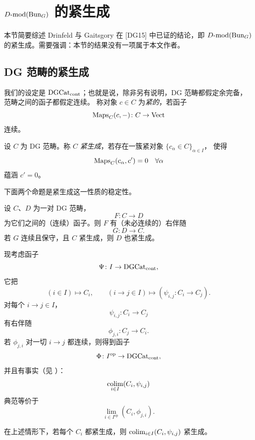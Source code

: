 
\section{\texorpdfstring{$D\text{-}\mathrm{mod}(\mathrm{Bun}_G)$ 的紧生成}{D-mod(G) 的紧生成}}
\label{sec:cg-bung}

本节简要综述 Drinfeld 与 Gaitsgory 在 [DG15] 中已证的结论，即
$D\text{-}\mathrm{mod}(\mathrm{Bun}_G)$ 的紧生成。需要强调：本节的结果没有一项属于本文作者。


\subsection{DG 范畴的紧生成}
\label{sec:cg-dg}

我们的设定是 $\mathrm{DGCat}_{\mathrm{cont}}$；也就是说，除非另有说明，DG 范畴都假定余完备，
范畴之间的函子都假定连续。
称对象 $c\in C$ 为\emph{紧的}，若函子
\[
\operatorname{Maps}_C(c,-)\colon C\to \mathrm{Vect}
\]
连续。

\begin{definition}[{[DG15, 1.2.2]}]
\label{def:comp-gen}
设 $C$ 为 DG 范畴。称 $C$ \emph{紧生成}，若存在一簇紧对象 $\{c_\alpha\in C\}_{\alpha\in I}$，
使得
\[
\operatorname{Maps}_C(c_\alpha,c')=0\quad\forall\alpha
\]
蕴涵 $c'=0$。
\end{definition}


下面两个命题是紧生成这一性质的稳定性。

\begin{proposition}
\label{prop:comp-gen-adjoint}
设 $C$、$D$ 为一对 DG 范畴，
\[
F\colon C\to D
\]
为它们之间的（连续）函子。则 $F$ 有（未必连续的）右伴随
\[
G\colon D\to C.
\]
若 $G$ 连续且保守，且 $C$ 紧生成，则 $D$ 也紧生成。
\end{proposition}

现考虑函子
\[
\Psi\colon I\to \mathrm{DGCat}_{\mathrm{cont}},
\]
它把
\[
(i\in I)\mapsto C_i,\qquad (i\to j\in I)\mapsto (\psi_{i,j}\colon C_i\to C_j).
\]
对每个 $i\to j\in I$，
\[
\psi_{i,j}\colon C_i\to C_j
\]
有右伴随
\[
\phi_{j,i}\colon C_j\to C_i.
\]
若 $\phi_{j,i}$ 对一切 $i\to j$ 都连续，则得到函子
\[
\Phi\colon I^{\mathrm{op}}\to \mathrm{DGCat}_{\mathrm{cont}},
\]
并且有事实（见 \cite[命题 1.7.5]{DG15}）：
\[
\operatorname*{colim}_{i\in I}(C_i,\psi_{i,j})
\]
典范等价于
\[
\lim_{i\in I^{\mathrm{op}}}(C_i,\phi_{j,i}).
\]

\begin{proposition}[{[DG15, 推论 1.9.4]}]
\label{prop:comp-gen-colim}
在上述情形下，若每个 $C_i$ 都紧生成，则 $\operatorname*{colim}_{i\in I}(C_i,\psi_{i,j})$ 紧生成。
\end{proposition}

